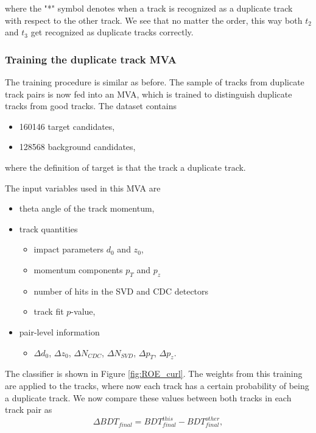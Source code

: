 \documentclass[oneside,a4paper,openany,12pt]{scrbook}
\begin{document}
where the "*" symbol denotes when a track is recognized as a duplicate track with respect to the other track. We see that no matter the order, this way both $t_2$ and $t_3$ get recognized as duplicate tracks correctly.

\subsubsection{Training the duplicate track MVA}

The training procedure is similar as before. The sample of tracks from duplicate track pairs is now fed into an MVA, which is trained to distinguish duplicate tracks from good tracks. The dataset contains
\begin{itemize}
\item 160146 target candidates,
\item 128568 background candidates,
\end{itemize}
where the definition of target is that the track a duplicate track. 

The input variables used in this MVA are
\begin{itemize}
\item theta angle of the track momentum,
\item track quantities
	\begin{itemize}
	\item impact parameters $d_0$ and $z_0$,
	\item momentum components $p_T$ and $p_z$
	\item number of hits in the SVD and CDC detectors
	\item track fit $p$-value,
	\end{itemize}
\item pair-level information
	\begin{itemize}
	\item $\Delta d_0$, $\Delta z_0$, $\Delta N_{CDC}$, $\Delta N_{SVD}$, $\Delta p_T$, $\Delta p_z$.  
	\end{itemize}
\end{itemize}

The classifier is shown in Figure \ref{fig:ROE_curl}. The weights from this training are applied to the tracks, where now each track has a certain probability of being a duplicate track. We now compare these values between both tracks in each track pair as
\begin{equation}
\Delta BDT_{final} = BDT_{final}^{this} - BDT_{final}^{other},
\end{equation}
\end{document}
